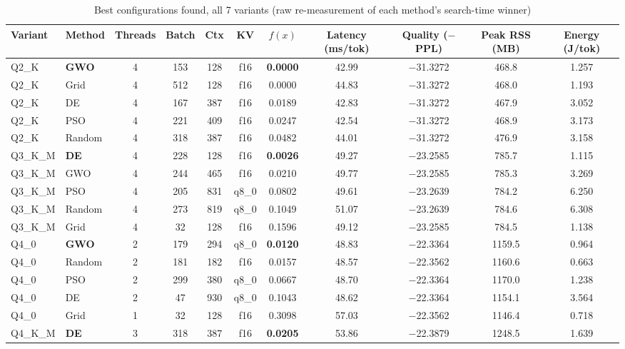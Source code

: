 \documentclass[conference, letterpaper]{IEEEtran}
\begin{document}
\begin{table}[t]
\caption{Best configurations found, all 7 variants (raw re-measurement of each method's search-time winner)}
\label{tab:best-configs-all}
\centering
\scriptsize
\begin{tabular}{@{}llccccccccc@{}}
\toprule
Variant & Method & Threads & Batch & Ctx & KV & $f(x)$ & Latency (ms/tok) & Quality ($-$PPL) & Peak RSS (MB) & Energy (J/tok) \\
\midrule
Q2\_K & \textbf{GWO} & 4 & 153 & 128 & f16 & \textbf{0.0000} & 42.99 & $-$31.3272 & 468.8 & 1.257 \\
Q2\_K & Grid & 4 & 512 & 128 & f16 & 0.0000 & 44.83 & $-$31.3272 & 468.0 & 1.193 \\
Q2\_K & DE & 4 & 167 & 387 & f16 & 0.0189 & 42.83 & $-$31.3272 & 467.9 & 3.052 \\
Q2\_K & PSO & 4 & 221 & 409 & f16 & 0.0247 & 42.54 & $-$31.3272 & 468.9 & 3.173 \\
Q2\_K & Random & 4 & 318 & 387 & f16 & 0.0482 & 44.01 & $-$31.3272 & 476.9 & 3.158 \\
\addlinespace
Q3\_K\_M & \textbf{DE} & 4 & 228 & 128 & f16  & \textbf{0.0026} & 49.27 & $-$23.2585 & 785.7 & 1.115 \\
Q3\_K\_M & GWO & 4 & 244 & 465 & f16  & 0.0210 & 49.77 & $-$23.2585 & 785.3 & 3.269 \\
Q3\_K\_M & PSO & 4 & 205 & 831 & q8\_0 & 0.0802 & 49.61 & $-$23.2639 & 784.2 & 6.250 \\
Q3\_K\_M & Random & 4 & 273 & 819 & q8\_0 & 0.1049 & 51.07 & $-$23.2639 & 784.6 & 6.308 \\
Q3\_K\_M & Grid & 4 & 32 & 128 & f16  & 0.1596 & 49.12 & $-$23.2585 & 784.5 & 1.138 \\
\addlinespace
Q4\_0 & \textbf{GWO} & 2 & 179 & 294 & q8\_0 & \textbf{0.0120} & 48.83 & $-$22.3364 & 1159.5 & 0.964 \\
Q4\_0 & Random & 2 & 181 & 182 & f16 & 0.0157 & 48.57 & $-$22.3562 & 1160.6 & 0.663 \\
Q4\_0 & PSO & 2 & 299 & 380 & q8\_0 & 0.0667 & 48.70 & $-$22.3364 & 1170.0 & 1.238 \\
Q4\_0 & DE & 2 & 47 & 930 & q8\_0 & 0.1043 & 48.62 & $-$22.3364 & 1154.1 & 3.564 \\
Q4\_0 & Grid & 1 & 32 & 128 & f16 & 0.3098 & 57.03 & $-$22.3562 & 1146.4 & 0.718 \\
\addlinespace
Q4\_K\_M & \textbf{DE}    & 3 & 318 & 387 & f16  & \textbf{0.0205} & 53.86 & $-$22.3879 & 1248.5 & 1.639 \\

\end{tabular}
\end{table}
\end{document}

